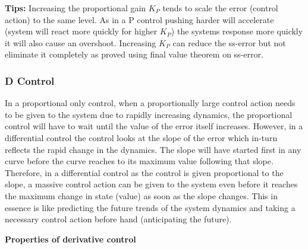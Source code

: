 \textbf{Tips: }Increasing the proportional gain $K_P$ tends to scale the error (control action) to the same level. As in a P control pushing harder will accelerate (system will react more quickly for higher $K_P$) the systems response more quickly it will also cause an overshoot. Increasing $K_P$ can reduce the ss-error but not eliminate it completely as proved using final value theorem on ss-error.

\subsubsection{D Control}

In a proportional only control, when a proportionally large control action needs to be given to the system due to rapidly increasing dynamics, the proportional control will have to wait until the value of the error itself increases. However, in a differential control the control looks at the slope of the error which in-turn reflects the rapid change in the dynamics. The slope will have started first in any curve before the curve reaches to its maximum value following that slope. Therefore, in a differential control as the control is given proportional to the slope, a massive control action can be given to the system even before it reaches the maximum change in state (value) as soon as the slope changes. This in essence is like predicting the future trends of the system dynamics and taking a necessary control action before hand (anticipating the future).

\textbf{Properties of derivative control}

